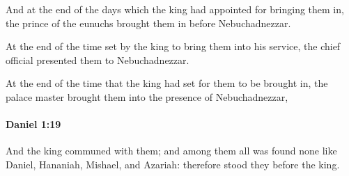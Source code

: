 			\begin{versebox}
					\item[BHS] 
					\item[LXX] 
					\item[ASV] And at the end of the days which the king had appointed for bringing them in, the prince of the eunuchs brought them in before Nebuchadnezzar.
					\item[NIV] At the end of the time set by the king to bring them into his service, the chief official presented them to Nebuchadnezzar.
					\item[NRSV] At the end of the time that the king had set for them to be brought in, the palace master brought them into the presence of Nebuchadnezzar,
			\end{versebox}

		\paragraph{Daniel 1:19} %
			\label{DANIEL-1-19}

			And the king communed with them; and among them all was found none like Daniel, Hananiah, Mishael, and Azariah: therefore stood they before the king.

